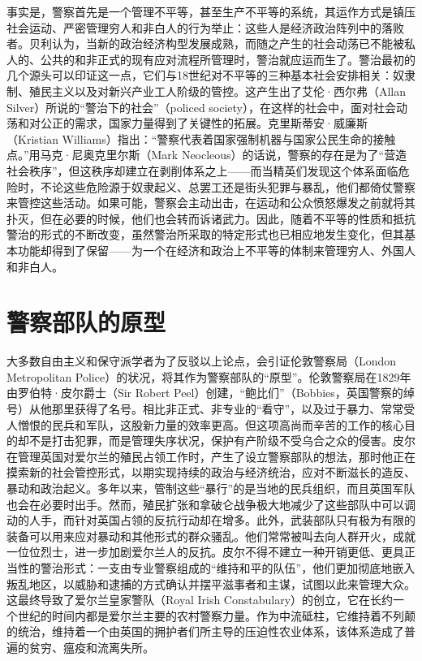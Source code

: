 \documentclass[fontset=fandol, a4paper, 12pt, openright]{ctexbook}
\begin{document}
事实是，警察首先是一个管理不平等，甚至生产不平等的系统，其运作方式是镇压社会运动、严密管理穷人和非白人的行为举止：这些人是经济政治阵列中的落败者。贝利认为，当新的政治经济构型发展成熟，而随之产生的社会动荡已不能被私人的、公共的和非正式的现有应对流程所管理时，警治就应运而生了。警治最初的几个源头可以印证这一点，它们与18世纪对不平等的三种基本社会安排相关：奴隶制、殖民主义以及对新兴产业工人阶级的管控。这产生出了艾伦·西尔弗（Allan Silver）所说的“警治下的社会”（policed society），在这样的社会中，面对社会动荡和对公正的需求，国家力量得到了关键性的拓展。克里斯蒂安·威廉斯（Kristian Williams）指出：“警察代表着国家强制机器与国家公民生命的接触点。”用马克·尼奥克里尔斯（Mark Neocleous）的话说，警察的存在是为了“营造社会秩序”，但这秩序却建立在剥削体系之上——而当精英们发现这个体系面临危险时，不论这些危险源于奴隶起义、总罢工还是街头犯罪与暴乱，他们都倚仗警察来管控这些活动。如果可能，警察会主动出击，在运动和公众愤怒爆发之前就将其扑灭，但在必要的时候，他们也会转而诉诸武力。因此，随着不平等的性质和抵抗警治的形式的不断改变，虽然警治所采取的特定形式也已相应地发生变化，但其基本功能却得到了保留——为一个在经济和政治上不平等的体制来管理穷人、外国人和非白人。

\section{警察部队的原型}

大多数自由主义和保守派学者为了反驳以上论点，会引证伦敦警察局（London Metropolitan Police）的状况，将其作为警察部队的“原型”。伦敦警察局在1829年由罗伯特·皮尔爵士（Sir Robert Peel）创建，“鲍比们”（Bobbies，英国警察的绰号）从他那里获得了名号。相比非正式、非专业的“看守”，以及过于暴力、常常受人憎恨的民兵和军队，这股新力量的效率更高。但这项高尚而辛苦的工作的核心目的却不是打击犯罪，而是管理失序状况，保护有产阶级不受乌合之众的侵害。皮尔在管理英国对爱尔兰的殖民占领工作时，产生了设立警察部队的想法，那时他正在摸索新的社会管控形式，以期实现持续的政治与经济统治，应对不断滋长的造反、暴动和政治起义。多年以来，管制这些“暴行”的是当地的民兵组织，而且英国军队也会在必要时出手。然而，殖民扩张和拿破仑战争极大地减少了这些部队中可以调动的人手，而针对英国占领的反抗行动却在增多。此外，武装部队只有极为有限的装备可以用来应对暴动和其他形式的群众骚乱。他们常常被叫去向人群开火，成就一位位烈士，进一步加剧爱尔兰人的反抗。皮尔不得不建立一种开销更低、更具正当性的警治形式：一支由专业警察组成的“维持和平的队伍”，他们更加彻底地嵌入叛乱地区，以威胁和逮捕的方式确认并摆平滋事者和主谋，试图以此来管理大众。这最终导致了爱尔兰皇家警队（Royal Irish Constabulary）的创立，它在长约一个世纪的时间内都是爱尔兰主要的农村警察力量。作为中流砥柱，它维持着不列颠的统治，维持着一个由英国的拥护者们所主导的压迫性农业体系，该体系造成了普遍的贫穷、瘟疫和流离失所。
\end{document}
